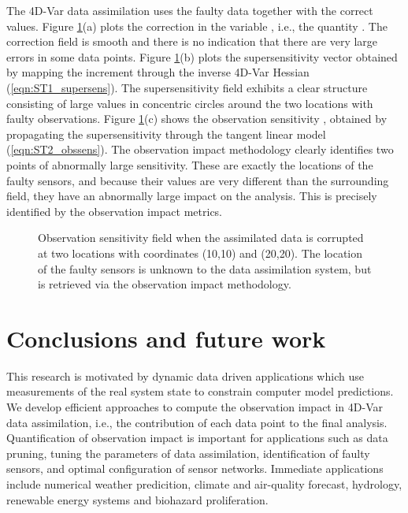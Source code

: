 \documentclass[final,sort&compress]{elsarticle}
\begin{document}
The 4D-Var data assimilation uses the faulty data together with the correct values.
Figure \ref{fig:faultysens}(a) plots the correction in the variable , i.e., the quantity .
The correction field is smooth and there is no indication that there are very large errors in some data points.
Figure \ref{fig:faultysens}(b) plots the supersensitivity vector  obtained by mapping the increment through the inverse 4D-Var Hessian (\ref{eqn:ST1_supersens}).
The supersensitivity field exhibits a clear structure consisting of large values in concentric circles around the two locations with faulty observations.
Figure \ref{fig:faultysens}(c) shows the observation sensitivity , obtained by propagating the supersensitivity through the tangent linear model (\ref{eqn:ST2_obssens}).
The observation impact methodology clearly identifies two points of abnormally large sensitivity. 
These are exactly the locations of the faulty sensors, 
and because their values are very different than the surrounding field, they have an abnormally large impact on the analysis.
This is precisely identified by the observation impact metrics.

\begin{figure}
\setcounter{subfigure}{0}
\centering
{}
\caption{Observation sensitivity field when the assimilated data is corrupted at two locations with coordinates (10,10) and (20,20).
The location of the faulty sensors is unknown to the data assimilation system, but is retrieved via the observation impact methodology.}
\label{fig:faultysens}
\end{figure}



\section{Conclusions and future work}\label{sec:concl}


This research is motivated by dynamic data driven applications which use measurements of 
the real system state to constrain computer model predictions. 
We develop efficient approaches to compute
the observation impact in 4D-Var data assimilation, i.e., the contribution of each data point to the final analysis.
Quantification of observation impact is important for applications such as data pruning, 
tuning the parameters of data assimilation,
identification of faulty sensors, and optimal configuration of sensor networks.
Immediate applications include  numerical weather predicition,
climate and air-quality forecast, hydrology, renewable energy systems and biohazard proliferation.
\end{document}
